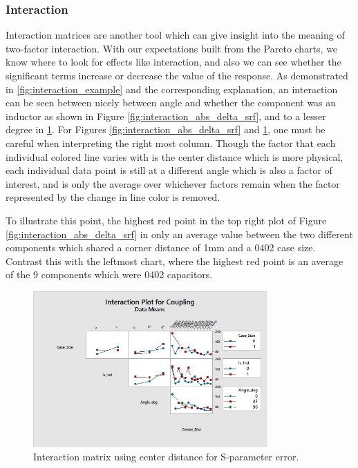 \documentclass[12pt]{usfcoe}
\begin{document}
    \subsubsection{Interaction}
    
    Interaction matrices are another tool which can give insight into the meaning of two-factor interaction. 
    With our expectations built from the Pareto charts, we know where to look for effects like interaction, and also we can see whether the significant terms increase or decrease the value of the response.
    As demonstrated in \ref{fig:interaction_example} and the corresponding explanation, an interaction can be seen between nicely between angle and whether the component was an inductor as shown in Figure \ref{fig:interaction_abs_delta_srf}, and to a lesser degree in \ref{fig:interaction_coupling}. 
    For Figures \ref{fig:interaction_abs_delta_srf} and \ref{fig:interaction_coupling}, one must be careful when interpreting the right most column. 
    Though the factor that each individual colored line varies with is the center distance which is more physical, each individual data point is still at a different angle which is also a factor of interest, and is only the average over whichever factors remain when the factor represented by the change in line color is removed.
    
    To illustrate this point, the highest red point in the top right plot of Figure \ref{fig:interaction_abs_delta_srf} in only an average value between the two different components which shared a corner distance of 1mm and a 0402 case size.
    Contrast this with the leftmost chart, where the highest red point is an average of the 9 components which were 0402 capacitors.


    \begin{figure}[H]
		\begin{center}
        	\includegraphics[width=0.8\textwidth]{images/ANOVA/interactions_coupling.jpg} 
			\caption{Interaction matrix using center distance for S-parameter error.} 
			\label{fig:interaction_coupling}
		\end{center}
    \end{figure}    
    
\end{document}
